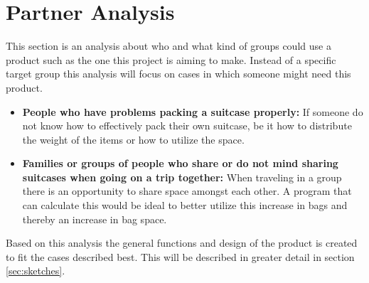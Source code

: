 \section{Partner Analysis}
This section is an analysis about who and what kind of groups could use a product such as the one this project is aiming to make.
Instead of a specific target group this analysis will focus on cases in which someone might need this product.
\begin{itemize}
\item \textbf{People who have problems packing a suitcase properly:}\newline
If someone do not know how to effectively pack their own suitcase, be it how to distribute the weight of the items or how to utilize the space.

\item \textbf{Families or groups of people who share or do not mind sharing suitcases when going on a trip together:}\newline
When traveling in a group there is an opportunity to share space amongst each other. A program that can calculate this would be ideal to better utilize this increase in bags and thereby an increase in bag space. 
\end{itemize}

Based on this analysis the general functions and design of the product is created to fit the cases described best. This will be described in greater detail in section \ref{sec:sketches}.